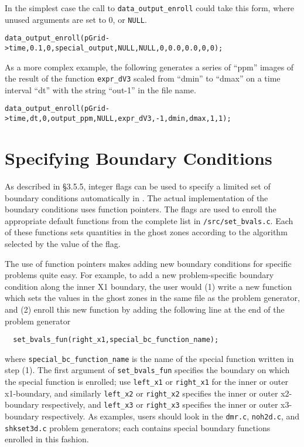 In the simplest case the call to {\tt data\_output\_enroll} could take 
this form, where unused arguments are set to 0, or {\tt NULL}.
\begin{verbatim}
data_output_enroll(pGrid->time,0.1,0,special_output,NULL,NULL,0,0.0,0.0,0,0);
\end{verbatim}
As a more complex example, the following generates a series of ``ppm''
images of the result of the function {\tt expr\_dV3} scaled from
``dmin'' to ``dmax'' on a time interval ``dt'' with the string
``out-1'' in the file name.
\begin{verbatim}
data_output_enroll(pGrid->time,dt,0,output_ppm,NULL,expr_dV3,-1,dmin,dmax,1,1);
\end{verbatim}

\section{Specifying Boundary Conditions}

As described in \S 3.5.5, integer flags can be used to specify a limited set
of boundary conditions automatically in \ath.  The actual implementation of
the boundary conditions uses function pointers.  The
flags are used to enroll the appropriate default 
functions from the complete list in {\tt /src/set\_bvals.c}.  Each of these
functions sets quantities in the ghost zones according to the 
algorithm selected by the value of the flag.

The use of function pointers makes adding new boundary conditions for
specific problems quite easy.  For example, to add a new problem-specific
boundary condition along the inner X1 boundary, the user would (1)
write a new function which sets the values in the ghost zones in the
same file as the problem generator, and (2) enroll this new function by
adding the following line at the end of the problem generator
\begin{verbatim}
  set_bvals_fun(right_x1,special_bc_function_name);
\end{verbatim}

\noindent
where {\tt special\_bc\_function\_name} is the name of the special
function written in step (1).  The first argument of {\tt set\_bvals\_fun}
specifies the boundary on which the special function is enrolled; use
{\tt left\_x1} or {\tt right\_x1} for the inner or outer x1-boundary,
and similarly {\tt left\_x2} or {\tt right\_x2} specifies the inner or
outer x2-boundary respectively, and {\tt left\_x3} or {\tt right\_x3}
specifies the inner or outer x3-boundary respectively.  As examples,
users should look in the {\tt dmr.c}, {\tt noh2d.c}, and {\tt shkset3d.c}
problem generators; each contains special boundary functions enrolled
in this fashion.

